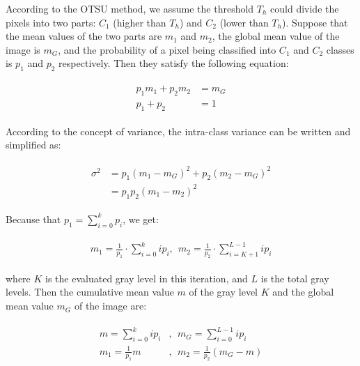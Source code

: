 \documentclass[hyperref]{article}
\theoremstyle{nonumberplain}
\begin{document}
	According to the OTSU method, we assume the threshold $T_{h}$ could divide the pixels into two parts: $C_{1}$ (higher than $T_{h}$) and $C_{2}$ (lower than $T_{h}$). Suppose that the mean values of the two parts are $m_{1}$ and $m_{2}$, the global mean value of the image is $m_{G}$, and the probability of a pixel being classified into $C_{1}$ and $C_{2}$ classes is $p_{1}$ and $p_{2}$ respectively. Then they satisfy the following equation:
	
	\begin{equation}
	\begin{split}
	\begin{aligned}
	p_{1}m_{1}+p_{2}m_{2}&=m_{G}\\
	p_{1}+p_{2}&=1
	\end{aligned}
	\end{split}
	\label{eq1}
	\end{equation}
	
	According to the concept of variance, the intra-class variance can be written and simplified as:
	
	\begin{equation}
	\begin{split}
	\begin{aligned}
	\sigma ^{2}&=p_{1}(m_{1}-m_{G})^{2}+p_{2}(m_{2}-m_{G})^{2}\\
	&=p_{1}p_{2}(m_{1}-m_{2})^{2}
	\end{aligned}
	\end{split}
	\label{eq2}
	\end{equation}
	
	Because that $p_{1}=\sum_{i=0}^{k}p_{i}$, we get:
	
	\begin{equation}
	\begin{split}
	\begin{aligned}
	m_{1}=\frac{1}{p_{1}}\cdot \sum_{i=0}^{k}ip_{i}, \ \
	m_{2}=\frac{1}{p_{2}}\cdot \sum_{i=K+1}^{L-1}ip_{i}
	\end{aligned}
	\end{split}
	\label{eq3}
	\end{equation}
	
	where $K$ is the evaluated gray level in this iteration, and $L$ is the total gray levels. Then the cumulative mean value $m$ of the gray level $K$ and the global mean value $m_{G}$ of the image are:
	
	\begin{equation}
	\begin{split}
	\begin{aligned}
	m=\sum_{i=0}^{k}ip_{i}&, \ \ m_{G}=\sum_{i=0}^{L-1}ip_{i}\\
	m_{1}=\frac{1}{p_{1}}m&, \ \ m_{2}=\frac{1}{p_{2}}(m_{G}-m)
	\end{aligned}
	\end{split}
	\label{eq4}
	\end{equation}
	
\end{document}
